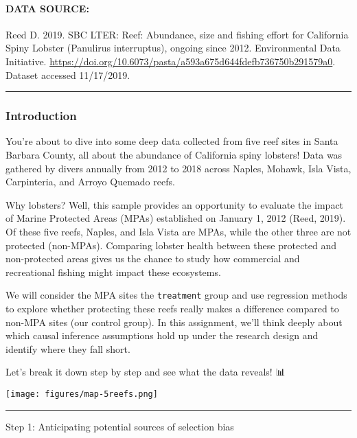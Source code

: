 \documentclass[
]{article}
\begin{document}
\paragraph{DATA SOURCE:}\label{data-source}

Reed D. 2019. SBC LTER: Reef: Abundance, size and fishing effort for
California Spiny Lobster (Panulirus interruptus), ongoing since 2012.
Environmental Data Initiative.
\url{https://doi.org/10.6073/pasta/a593a675d644fdefb736750b291579a0}.
Dataset accessed 11/17/2019.

\begin{center}\rule{0.5\linewidth}{0.5pt}\end{center}

\subsubsection{\texorpdfstring{\textbf{Introduction}}{Introduction}}\label{introduction}

You're about to dive into some deep data collected from five reef sites
in Santa Barbara County, all about the abundance of California spiny
lobsters! Data was gathered by divers annually from 2012 to 2018 across
Naples, Mohawk, Isla Vista, Carpinteria, and Arroyo Quemado reefs.

Why lobsters? Well, this sample provides an opportunity to evaluate the
impact of Marine Protected Areas (MPAs) established on January 1, 2012
(Reed, 2019). Of these five reefs, Naples, and Isla Vista are MPAs,
while the other three are not protected (non-MPAs). Comparing lobster
health between these protected and non-protected areas gives us the
chance to study how commercial and recreational fishing might impact
these ecosystems.

We will consider the MPA sites the \texttt{treatment} group and use
regression methods to explore whether protecting these reefs really
makes a difference compared to non-MPA sites (our control group). In
this assignment, we'll think deeply about which causal inference
assumptions hold up under the research design and identify where they
fall short.

Let's break it down step by step and see what the data reveals! 📊

\texttt{[image: figures/map-5reefs.png]}

\begin{center}\rule{0.5\linewidth}{0.5pt}\end{center}

Step 1: Anticipating potential sources of selection bias
\end{document}
